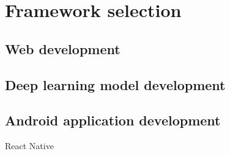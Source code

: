 \section{Framework selection}
\label{sec:Framework selection}
\subsection{Web development} %
\citet{nodejs2021}

\citet{react2021}

\citet{redux2021}

\subsection{Deep learning model development} %
\citet{abadi2015tensorflow}

\citet{steiner2019pytorch}

\citet{florencio2019performance}

\subsection{Android application development} %
\citet{singh2020mobile}

\citet{fadlilah2021development}

React Native \citet{eisenman2015learning}